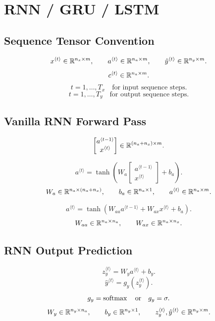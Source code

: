 \section{RNN / GRU / LSTM}

\subsection{Sequence Tensor Convention}

\[
x^{\langle t\rangle}
\in
\mathbb{R}^{n_x \times m},
\qquad
a^{\langle t\rangle}
\in
\mathbb{R}^{n_a \times m},
\qquad
\hat{y}^{\langle t\rangle}
\in
\mathbb{R}^{n_y \times m}.
\]
\[
c^{\langle t\rangle}
\in
\mathbb{R}^{n_a \times m}.
\]
\[
t=1,\dots,T_x
\quad\text{for input sequence steps}.
\]
\[
t=1,\dots,T_y
\quad\text{for output sequence steps}.
\]

\subsection{Vanilla RNN Forward Pass}

\[
\begin{bmatrix}
a^{\langle t-1\rangle}\\
x^{\langle t\rangle}
\end{bmatrix}
\in
\mathbb{R}^{(n_a+n_x)\times m}.
\]

\[
a^{\langle t\rangle}
=
\tanh
\left(
W_a
\begin{bmatrix}
a^{\langle t-1\rangle}\\
x^{\langle t\rangle}
\end{bmatrix}
+
b_a
\right).
\]
\[
W_a
\in
\mathbb{R}^{n_a \times (n_a+n_x)},
\qquad
b_a
\in
\mathbb{R}^{n_a \times 1},
\qquad
a^{\langle t\rangle}
\in
\mathbb{R}^{n_a \times m}.
\]

\[
a^{\langle t\rangle}
=
\tanh
\left(
W_{aa}a^{\langle t-1\rangle}
+
W_{ax}x^{\langle t\rangle}
+
b_a
\right).
\]
\[
W_{aa}\in\mathbb{R}^{n_a\times n_a},
\qquad
W_{ax}\in\mathbb{R}^{n_a\times n_x}.
\]

\subsection{RNN Output Prediction}

\[
z_y^{\langle t\rangle}
=
W_y a^{\langle t\rangle}
+
b_y.
\]
\[
\hat{y}^{\langle t\rangle}
=
g_y
\left(
z_y^{\langle t\rangle}
\right).
\]
\[
g_y=\operatorname{softmax}
\quad\text{or}\quad
g_y=\sigma.
\]
\[
W_y \in \mathbb{R}^{n_y \times n_a},
\qquad
b_y \in \mathbb{R}^{n_y \times 1},
\qquad
z_y^{\langle t\rangle},
\hat{y}^{\langle t\rangle}
\in
\mathbb{R}^{n_y \times m}.
\]

